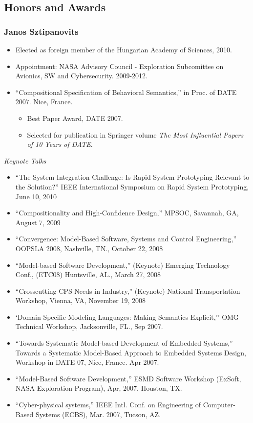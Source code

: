 \subsection{Honors and Awards}

\subsubsection{Janos Sztipanovits}

\begin{itemize}
\item Elected as foreign member of the Hungarian Academy of Sciences, 2010.
\item Appointment: NASA Advisory Council - Exploration Subcomittee on Avionics, SW and Cybersecurity. 2009-2012.
\item ``Compositional Specification of Behavioral Semantics,'' in Proc. of DATE 2007. Nice, France.
\begin{itemize}
\item Best Paper Award, DATE 2007.
\item Selected for publication in Springer volume \emph{The Most Influential Papers of 10 Years of DATE}.
\end{itemize}
\end{itemize}

\emph{Keynote Talks}
\begin{itemize}
\item ``The System Integration Challenge: Is Rapid System Prototyping Relevant to the Solution?'' IEEE International Symposium on Rapid System Prototyping, June 10, 2010
\item ``Compositionality and High-Confidence Design,'' MPSOC, Savannah, GA, August 7, 2009
\item ``Convergence: Model-Based Software, Systems and Control Engineering,'' OOPSLA 2008, Nashville, TN., October 22, 2008
\item ``Model-based Software Development,'' (Keynote) Emerging Technology Conf., (ETC08) Huntsville, AL., March 27, 2008
\item ``Crosscutting CPS Needs in Industry,'' (Keynote) National Transportation Workshop, Vienna, VA, November 19, 2008
\item `Domain Specific Modeling Languages: Making Semantics Explicit,'' OMG Technical Workshop, Jacksonville, FL., Sep 2007.
\item ``Towards Systematic Model-based Development of Embedded Systems,'' Towards a Systematic Model-Based Approach to Embedded Systems Design, Workshop in DATE 07, Nice, France.  Apr 2007.
\item ``Model-Based Software Development,'' ESMD Software Workshop (ExSoft, NASA Exploration Program), Apr, 2007. Houston, TX.
\item ``Cyber-physical systems,'' IEEE Intl. Conf. on Engineering of Computer-Based Systems (ECBS), Mar. 2007, Tucson, AZ.
\end{itemize}

